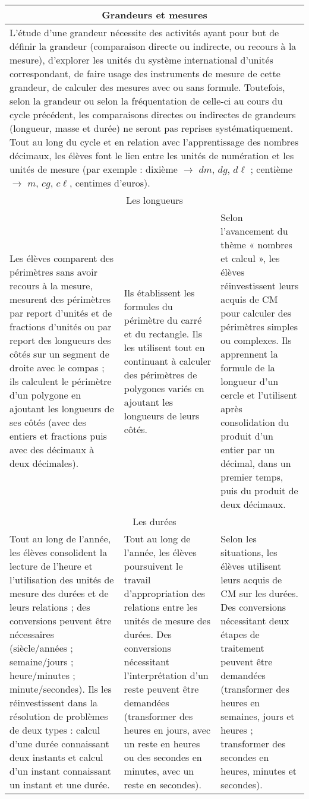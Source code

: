 \documentclass[11pt]{article}
\newcommand{\categorie}[1]{\hline\multicolumn{3}{|c|}{\color{white}\Large\cellcolor{or}\sffamily\phantom{É} #1 \phantom{É}}\rmfamily \\\hline}
\newcommand{\souscategorie}[1]{\hline\multicolumn{3}{|c|}{\color{or}\sffamily\phantom{É}#1\phantom{É}\rmfamily}\\\hline}
\newcommand{\note}[1]{\hline\multicolumn{3}{|p{18.6cm}|}{#1} \\ \hline}
\newenvironment{programme}
{
    \setlength{\arrayrulewidth}{0.5pt}
    \arrayrulecolor{or}
    \begin{center}
    \begin{tabular}{|p{6.4cm}|p{6.4cm}|p{6.4cm}|}
}
{
    \hline
    \end{tabular}
    \end{center}
}
\begin{document}
\begin{programme}
    \categorie{Grandeurs et mesures} 
    \note{L’étude d’une grandeur nécessite des activités ayant pour but de définir la grandeur (comparaison directe ou indirecte, ou recours à la mesure), d’explorer les unités du système international d’unités correspondant, de faire usage des instruments de mesure de cette grandeur, de calculer des mesures avec ou sans formule. Toutefois, selon la grandeur ou selon la fréquentation de celle-ci au cours du cycle précédent, les comparaisons directes ou indirectes de grandeurs (longueur, masse et durée) ne seront pas reprises systématiquement. Tout au long du cycle et en relation avec l’apprentissage des nombres décimaux, les élèves font le lien entre les unités de numération et les unités de mesure (par exemple : dixième $\longrightarrow$ $dm$, $dg$, $d\ell$ ; centième $\longrightarrow$ $m$, $cg$, $c\ell$, centimes d’euros).} 
    \souscategorie{Les longueurs} 
    Les élèves comparent des périmètres sans avoir recours à la mesure, mesurent des périmètres par report d’unités et de fractions d’unités ou par report des longueurs des côtés sur un segment de droite avec le compas ; ils calculent le périmètre d’un polygone en ajoutant les longueurs de ses côtés (avec des entiers et fractions puis avec des décimaux à deux décimales). & Ils établissent les formules du périmètre du carré et du rectangle. Ils les utilisent tout en continuant à calculer des périmètres de polygones variés en ajoutant les longueurs de leurs côtés. & Selon l’avancement du thème « nombres et calcul », les élèves réinvestissent leurs acquis de CM pour calculer des périmètres simples ou complexes. Ils apprennent la formule de la longueur d’un cercle et l’utilisent après consolidation du produit d’un entier par un décimal, dans un premier temps, puis du produit de deux décimaux. \\
    \souscategorie{Les durées} 
    Tout au long de l’année, les élèves consolident la lecture de l’heure et l’utilisation des unités de mesure des durées et de leurs relations ; des conversions peuvent être nécessaires (siècle/années ; semaine/jours ; heure/minutes ; minute/secondes). Ils les réinvestissent dans la résolution de problèmes de deux types : calcul d’une durée connaissant deux instants et calcul d’un instant connaissant un instant et une durée. & Tout au long de l’année, les élèves poursuivent le travail d’appropriation des relations entre les unités de mesure des durées. Des conversions nécessitant l’interprétation d’un reste peuvent être demandées (transformer des heures en jours, avec un reste en heures ou des secondes en minutes, avec un reste en secondes). & Selon les situations, les élèves utilisent leurs acquis de CM sur les durées. Des conversions nécessitant deux étapes de traitement peuvent être demandées (transformer des heures en semaines, jours et heures ; transformer des secondes en heures, minutes et secondes). \\
\end{programme}
\end{document}
